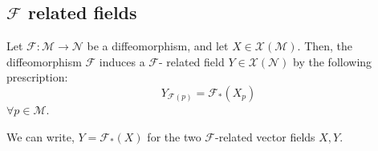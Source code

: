     \subsection{$\mathcal{F}$ related fields}
      \begin{definition}
        Let $\mathcal{F}: \mathcal{M} \rightarrow \mathcal{N}$ be a
        diffeomorphism, and let $X \in \mathcal{X}(\mathcal{M})$. Then,
        the diffeomorphism $\mathcal{F}$ induces a $\mathcal{F}$- related
        field $Y \in \mathcal{X}(\mathcal{N})$ by the following
        prescription:
        \[Y_{\mathcal{F}(p)} = \mathcal{F}_{*}(X_p)\]
        $\forall p \in \mathcal{M}$.

        We can write, $Y = \mathcal{F}_{*}\left(X\right)$ for the two
        $\mathcal{F}$-related vector fields $X,Y$.
      \end{definition}
